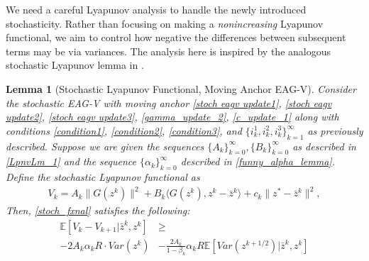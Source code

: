 \documentclass[11pt,reqno,oneside]{amsart}
\newtheorem{lemma}[theorem]{Lemma}
\theoremstyle{definition}
\numberwithin{equation}{section}
\begin{document}
We need a careful Lyapunov analysis to handle the newly introduced stochasticity.
Rather than focusing on making a \textit{nonincreasing} Lyapunov functional, we aim to control how negative the differences between subsequent terms may be via variances.
The analysis here is inspired by the analogous stochastic Lyapunov lemma in \cite{lee2021fast}.

\begin{lemma}[Stochastic Lyapunov Functional, Moving Anchor EAG-V] \label{stochastic_descent_lemma}
    Consider the stochastic EAG-V with moving anchor \eqref{stoch eagv update1}, \eqref{stoch eagv update2}, \eqref{stoch eagv update3}, \eqref{gamma_update_2}, \eqref{c_update_1} along with conditions \ref{condition1}, \ref{condition2}, \ref{condition3}, and $\{i_{k}^{1}, i_{k}^{2}, i_{k}^{3}\}_{k=1}^{\infty}$ as previously described.
    Suppose we are given the sequences $\{A_{k}\}_{k=0}^{\infty}, \{B_{k}\}_{k=0}^{\infty}$ as described in \cref{LpnvLm_1} and the sequence $\{\alpha_{k}\}_{k=0}^{\infty}$ described in \cref{funny_alpha_lemma}. 
    Define the stochastic Lyapunov functional as
    \begin{align}
        V_{k} = A_{k}\|G(z^{k})\|^{2}+B_{k}\langle G(z^{k}), z^{k}-\bar{z}^{k}\rangle + c_k\|z^{*} - \bar{z}^{k}\|^{2}, \label{stoch_fxnal}
    \end{align}
    Then, \eqref{stoch_fxnal} satisfies the following:
    \begin{align*}
        \mathbb{E}[V_{k} - V_{k+1} | \bar{z}^{k},z^{k}] & \geq \\
         -2A_{k}\alpha_{k}R\cdot Var(z^{k})& - \frac{2A_{k}}{1-\beta_{k}}\alpha_{k}R\mathbb{E}[Var(z^{k+1/2})|\bar{z}^{k},z^{k}]
    \end{align*}
\end{lemma}
\end{document}

